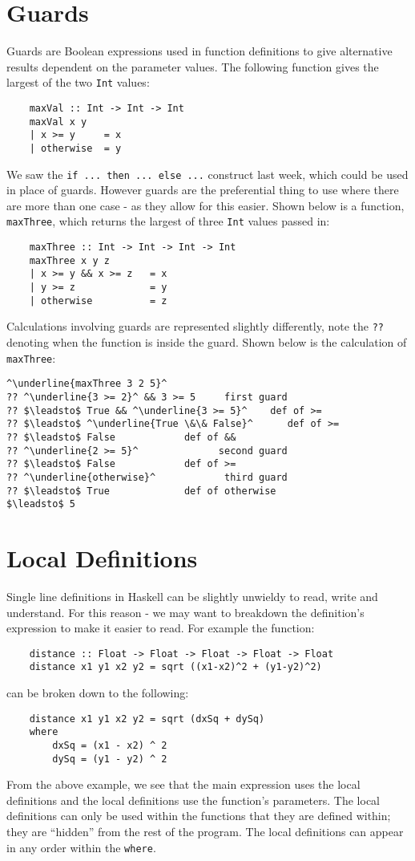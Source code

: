 \section{Guards}
Guards are Boolean expressions used in function definitions to give alternative results dependent on the parameter values. The following function gives the largest of the two \verb|Int| values:
\begin{verbatim}
    maxVal :: Int -> Int -> Int
    maxVal x y
    | x >= y     = x
    | otherwise  = y
\end{verbatim}
We saw the \verb|if ... then ... else ...| construct last week, which could be used in place of guards. However guards are the preferential thing to use where there are more than one case - as they allow for this easier. Shown below is a function, \verb|maxThree|, which returns the largest of three \verb|Int| values passed in:
\begin{verbatim}
    maxThree :: Int -> Int -> Int -> Int
    maxThree x y z
    | x >= y && x >= z   = x
    | y >= z             = y
    | otherwise          = z
\end{verbatim}
Calculations involving guards are represented slightly differently, note the \verb|??| denoting when the function is inside the guard. Shown below is the calculation of \verb|maxThree|:
\begin{lstlisting}[style=haskellTrace]
^\underline{maxThree 3 2 5}^
?? ^\underline{3 >= 2}^ && 3 >= 5     first guard
?? $\leadsto$ True && ^\underline{3 >= 5}^    def of >=
?? $\leadsto$ ^\underline{True \&\& False}^      def of >=
?? $\leadsto$ False            def of &&
?? ^\underline{2 >= 5}^              second guard
?? $\leadsto$ False            def of >=
?? ^\underline{otherwise}^            third guard
?? $\leadsto$ True             def of otherwise
$\leadsto$ 5
\end{lstlisting}


\section{Local Definitions}
Single line definitions in Haskell can be slightly unwieldy to read, write and understand. For this reason - we may want to breakdown the definition's expression to make it easier to read. For example the function:
\begin{verbatim}
    distance :: Float -> Float -> Float -> Float -> Float
    distance x1 y1 x2 y2 = sqrt ((x1-x2)^2 + (y1-y2)^2)
\end{verbatim}
can be broken down to the following:
\begin{verbatim}
    distance x1 y1 x2 y2 = sqrt (dxSq + dySq)
    where
        dxSq = (x1 - x2) ^ 2
        dySq = (y1 - y2) ^ 2
\end{verbatim}
From the above example, we see that the main expression uses the local definitions and the local definitions use the function's parameters. The local definitions can only be used within the functions that they are defined within; they are ``hidden'' from the rest of the program. The local definitions can appear in any order within the \verb|where|. 